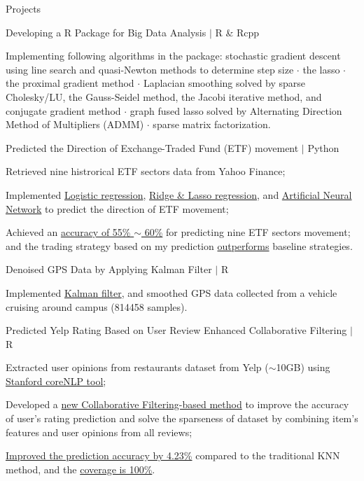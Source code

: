 \documentclass{my_resume} %
\begin{document}

\begin{rSection}{Projects}

  \begin {rSubsection}{Developing a R Package for Big Data Analysis $|$ R \&
    Rcpp}{}{}
  \item Implementing following algorithms in the package: stochastic gradient
    descent using line search and quasi-Newton methods to determine step size
    {$\cdot$} the lasso {$\cdot$} the proximal gradient method {$\cdot$}
    Laplacian smoothing solved by sparse Cholesky/LU, the Gauss-Seidel method,
    the Jacobi iterative method, and conjugate gradient method {$\cdot$} graph
    fused lasso solved by Alternating Direction Method of Multipliers (ADMM)
    {$\cdot$} sparse matrix factorization.
  \end{rSubsection}

  \begin{rSubsection}{Predicted the Direction of Exchange-Traded Fund
    (ETF) movement $|$ Python}{}{}
  \item Retrieved nine histrorical ETF sectors data from Yahoo Finance;
  \item Implemented \underline{Logistic regression}, \underline{Ridge \& Lasso
    regression}, and \underline{Artificial Neural Network} to predict the
    direction of ETF movement;
  \item Achieved an \underline{accuracy of 55\% $\sim$ 60\%} for predicting
    nine ETF sectors movement; and the trading strategy based on my prediction
    \underline{outperforms} baseline strategies.
  \end{rSubsection}

  \begin{rSubsection}{Denoised GPS Data by Applying Kalman Filter $|$ R}{}{}
  \item Implemented \underline{Kalman filter}, and smoothed GPS data collected from
    a vehicle cruising around campus (814458 samples).
  \end{rSubsection}

  \begin{rSubsection}{Predicted Yelp Rating Based on User Review Enhanced
    Collaborative Filtering $|$ R}{}{}
  \item Extracted user opinions from restaurants dataset from Yelp ($\sim$10GB)
    using \underline{Stanford coreNLP tool};
  \item Developed a \underline{new Collaborative Filtering-based method} to
    improve the accuracy of user's rating prediction and solve the sparseness
    of dataset by combining item's features and user opinions from all reviews;
  \item \underline{Improved the prediction accuracy by 4.23\%} compared to the
    traditional KNN method, and the \underline{coverage is 100\%}.
  \end{rSubsection}


\end{rSection}
\end{document}
